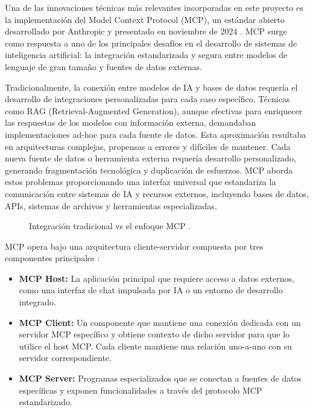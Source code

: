 Una de las innovaciones técnicas más relevantes incorporadas en este proyecto es la implementación del Model Context Protocol (MCP), un estándar abierto desarrollado por Anthropic y presentado en noviembre de 2024 \cite{AnthropicMCP2024}. MCP surge como respuesta a uno de los principales desafíos en el desarrollo de sistemas de inteligencia artificial: la integración estandarizada y segura entre modelos de lenguaje de gran tamaño y fuentes de datos externas.


Tradicionalmente, la conexión entre modelos de IA y bases de datos requería el desarrollo de integraciones personalizadas para cada caso específico. Técnicas como RAG (Retrieval-Augmented Generation), aunque efectivas para enriquecer las respuestas de los modelos con información externa, demandaban implementaciones ad-hoc para cada fuente de datos. Esta aproximación resultaba en arquitecturas complejas, propensas a errores y difíciles de mantener. Cada nueva fuente de datos o herramienta externa requería desarrollo personalizado, generando fragmentación tecnológica y duplicación de esfuerzos. MCP aborda estos problemas proporcionando una interfaz universal que estandariza la comunicación entre sistemas de IA y recursos externos, incluyendo bases de datos, APIs, sistemas de archivos y herramientas especializadas.

\begin{figure}[H]
  \centering
  \caption{Integración tradicional vs el enfoque MCP \cite{mcp1foto}.}
  \label{fig:mcp1}
\end{figure}


MCP opera bajo una arquitectura cliente-servidor compuesta por tres componentes principales \cite{mcp_arch}:

\begin{itemize}
\item \textbf{MCP Host:} La aplicación principal que requiere acceso a datos externos, como una interfaz de chat impulsada por IA o un entorno de desarrollo integrado.
\item \textbf{MCP Client:} Un componente que mantiene una conexión dedicada con un servidor MCP específico y obtiene contexto de dicho servidor para que lo utilice el host MCP. Cada cliente mantiene una relación uno-a-uno con su servidor correspondiente.
\item \textbf{MCP Server:} Programas especializados que se conectan a fuentes de datos específicas y exponen funcionalidades a través del protocolo MCP estandarizado.
\end{itemize}


